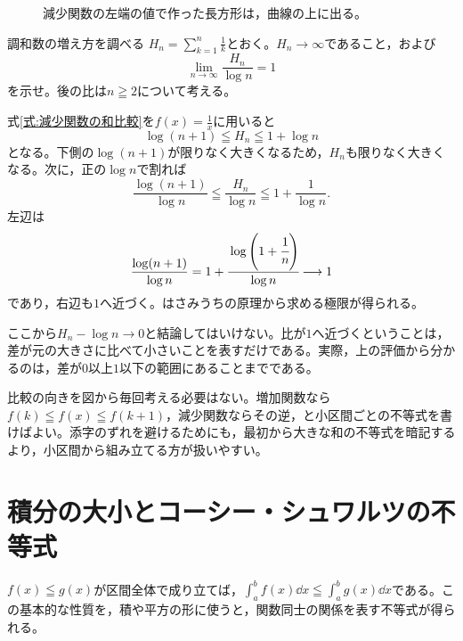 \begin{figure}[htbp]
 \centering
 \caption{減少関数の左端の値で作った長方形は，曲線の上に出る。}
 \label{図:和と積分の比較}
\end{figure}

\begin{example}{調和数の増え方を調べる}
$H_n=\sum_{k=1}^{n}\frac1k$とおく。$H_n\to\infty$であること，および
\[
 \lim_{n\to\infty}\frac{H_n}{\log n}=1
\]
を示せ。後の比は$n\geqq2$について考える。
\end{example}

式\eqref{式:減少関数の和比較}を$f(x)=\frac1x$に用いると
\[
 \log(n+1)\leqq H_n\leqq1+\log n
\]
となる。下側の$\log(n+1)$が限りなく大きくなるため，$H_n$も限りなく大きくなる。次に，正の$\log n$で割れば
\[
 \frac{\log(n+1)}{\log n}
 \leqq\frac{H_n}{\log n}
 \leqq1+\frac1{\log n}.
\]
左辺は
\[
 \frac{\log(n+1)}{\log n}
 =1+\cfrac{\log\left(1+\cfrac1n\right)}{\log n}
 \longrightarrow1
\]
であり，右辺も$1$へ近づく。はさみうちの原理から求める極限が得られる。

ここから$H_n-\log n\to0$と結論してはいけない。比が$1$へ近づくということは，差が元の大きさに比べて小さいことを表すだけである。実際，上の評価から分かるのは，差が$0$以上$1$以下の範囲にあることまでである。

比較の向きを図から毎回考える必要はない。増加関数なら$f(k)\leqq f(x)\leqq f(k+1)$，減少関数ならその逆，と小区間ごとの不等式を書けばよい。添字のずれを避けるためにも，最初から大きな和の不等式を暗記するより，小区間から組み立てる方が扱いやすい。

\section{積分の大小とコーシー・シュワルツの不等式}\label{節:積分の不等式}

$f(x)\leqq g(x)$が区間全体で成り立てば，$\int_a^b f(x)\dd x\leqq\int_a^b g(x)\dd x$である。この基本的な性質を，積や平方の形に使うと，関数同士の関係を表す不等式が得られる。

